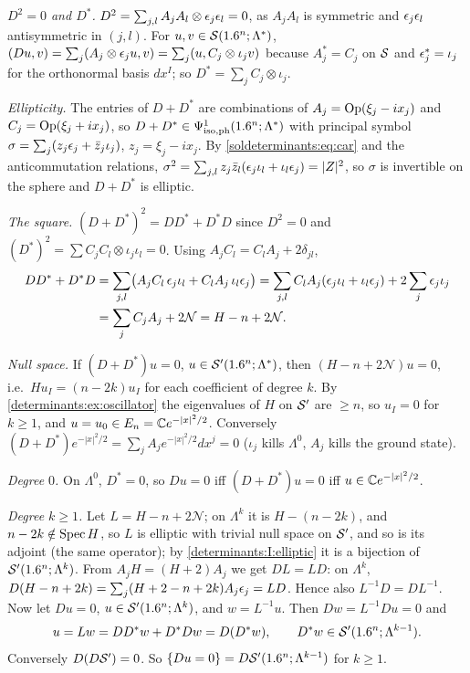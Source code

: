 \emph{$D^2=0$ and $D^*$.} $D^2=\sum_{j,l}A_jA_l\otimes\epsilon_j\epsilon_l=0$, as $A_jA_l$ is symmetric and
$\epsilon_j\epsilon_l$ antisymmetric in $(j,l)$. For $u,v\in\mathcal{S}(1.6^n;\Lambda^*)$,
$(Du,v)=\sum_j(A_j\otimes\epsilon_ju,v)=\sum_j(u,C_j\otimes\iota_jv)$ because $A_j^*=C_j$ on $\mathcal{S}$ and
$\epsilon_j^*=\iota_j$ for the orthonormal basis $dx^I$; so $D^*=\sum_jC_j\otimes\iota_j$.

\emph{Ellipticity.} The entries of $D+D^*$ are combinations of $A_j=\operatorname{Op}(\xi_j-ix_j)$ and
$C_j=\operatorname{Op}(\xi_j+ix_j)$, so $D+D^*\in\Psi^{1}_{\mathrm{iso,ph}}(1.6^n;\Lambda^*)$ with principal symbol
$\sigma=\sum_j(z_j\epsilon_j+\bar z_j\iota_j)$, $z_j=\xi_j-ix_j$. By \eqref{soldeterminants:eq:car} and the
anticommutation relations, $\sigma^2=\sum_{j,l}z_j\bar z_l(\epsilon_j\iota_l+\iota_l\epsilon_j)=|Z|^2$, so $\sigma$ is
invertible on the sphere and $D+D^*$ is elliptic.

\emph{The square.} $(D+D^*)^2=DD^*+D^*D$ since $D^2=0$ and $(D^*)^2=\sum C_jC_l\otimes\iota_j\iota_l=0$.
Using $A_jC_l=C_lA_j+2\delta_{jl}$,
\begin{align*}
  DD^*+D^*D&=\sum_{j,l}\bigl(A_jC_l\,\epsilon_j\iota_l+C_lA_j\,\iota_l\epsilon_j\bigr)
  =\sum_{j,l}C_lA_j(\epsilon_j\iota_l+\iota_l\epsilon_j)+2\sum_j\epsilon_j\iota_j\\
  &=\sum_jC_jA_j+2\mathcal N=H-n+2\mathcal N .
\end{align*}

\emph{Null space.} If $(D+D^*)u=0$, $u\in\mathcal{S}'(1.6^n;\Lambda^*)$, then $(H-n+2\mathcal N)u=0$, i.e.\
$Hu_I=(n-2k)u_I$ for each coefficient of degree $k$. By \cref{determinants:ex:oscillator} the eigenvalues
of $H$ on $\mathcal{S}'$ are $\ge n$, so $u_I=0$ for $k\ge1$, and $u=u_0\in E_n=\mathbb{C} e^{-|x|^2/2}$. Conversely
$(D+D^*)e^{-|x|^2/2}=\sum_jA_je^{-|x|^2/2}dx^j=0$ ($\iota_j$ kills $\Lambda^0$, $A_j$ kills the ground state).

\emph{Degree $0$.} On $\Lambda^0$, $D^*=0$, so $Du=0$ iff $(D+D^*)u=0$ iff $u\in\mathbb{C} e^{-|x|^2/2}$.

\emph{Degree $k\ge1$.} Let $L=H-n+2\mathcal N$; on $\Lambda^k$ it is $H-(n-2k)$, and $n-2k\notin\operatorname{Spec} H$, so
$L$ is elliptic with trivial null space on $\mathcal{S}'$, and so is its adjoint (the same operator); by
\ref{determinants:I:elliptic} it is a bijection of $\mathcal{S}'(1.6^n;\Lambda^k)$. From $A_jH=(H+2)A_j$ we get
$DL=LD$: on $\Lambda^k$, $D(H-n+2k)=\sum_j(H+2-n+2k)A_j\epsilon_j=L D$. Hence also $L^{-1}D=DL^{-1}$. Now let
$Du=0$, $u\in\mathcal{S}'(1.6^n;\Lambda^k)$, and $w=L^{-1}u$. Then $Dw=L^{-1}Du=0$ and
\begin{equation*}
  u=Lw=DD^*w+D^*Dw=D(D^*w),\qquad D^*w\in\mathcal{S}'(1.6^n;\Lambda^{k-1}).
\end{equation*}
Conversely $D(D\mathcal{S}')=0$. So $\{Du=0\}=D\mathcal{S}'(1.6^n;\Lambda^{k-1})$ for $k\ge1$.

